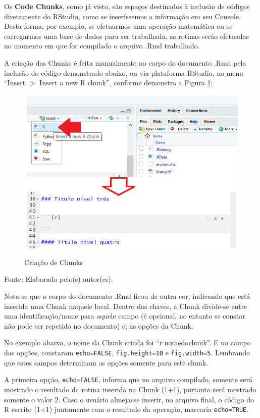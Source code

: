 \documentclass[12pt,brazil,oneside]{book}
\begin{document}
Os \textbf{Code Chunks}, como já visto, são espaços destinados à inclusão de códigos diretamente do RStudio, como se inseríssemos a informação em seu Console. Desta forma, por exemplo, se efetuarmos uma operação matemática ou se carregarmos uma base de dados para ser trabalhada, as rotinas serão efetuadas no momento em que for compilado o arquivo .Rmd trabalhado.

A criação das Chunks é feita manualmente no corpo do documento .Rmd pela inclusão do código demonstrado abaixo, ou via plataforma RStudio, no menu ``Insert \(>\) Insert a new R chunk'', conforme demonstra a Figura \ref{fig:rmarkchunk1}:

\begin{figure}[H]

{\centering \includegraphics[width=0.7\linewidth]{rmarkchunk1} 

}

\caption{Criação de Chunks}\label{fig:rmarkchunk1}
\end{figure}

Fonte: Elaborado pelo(s) autor(es).

Nota-se que o corpo do documento .Rmd ficou de outra cor, indicando que está inserida uma Chunk naquele local. Dentro das chaves, a Chunk divide-se entre uma identificação/nome para aquele campo (é opcional, no entanto se constar não pode ser repetido no documento) e; as opções da Chunk.

No exemplo abaixo, o nome da Chunk criada foi ``r nomedochunk''. E no campo das opções, constaram \texttt{echo=FALSE}, \texttt{fig.height=10} e \texttt{fig.width=5}. Lembrando que estes campos determinam as opções somente para este chunk.

A primeira opção, \texttt{echo=FALSE}, informa que no arquivo compilado, somente será mostrado o resultado da rotina inserida na Chunk (1+1), portanto será mostrado somente o valor 2. Caso o usuário almejasse inserir, no arquivo final, o código do R escrito (1+1) juntamente com o resultado da operação, marcaria \texttt{echo=TRUE}.
\end{document}
